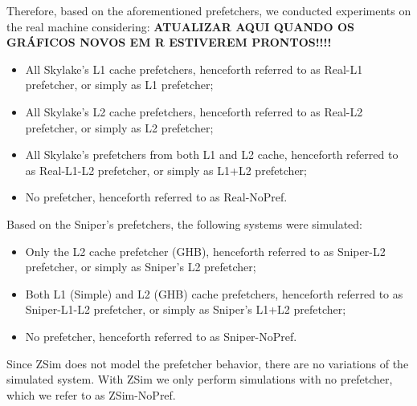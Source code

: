 \documentclass[AMA,final,STIX1COL]{WileyNJD-v2}
\begin{document}
Therefore, based on the aforementioned prefetchers, we conducted experiments on the real machine considering: \textbf{ATUALIZAR AQUI QUANDO OS GRÁFICOS NOVOS EM R ESTIVEREM PRONTOS!!!!}
\begin{itemize}
    \item All Skylake's L1 cache prefetchers, henceforth referred to as Real-L1 prefetcher, or simply as L1 prefetcher;
    \item All Skylake's L2 cache prefetchers, henceforth referred to as Real-L2 prefetcher, or simply as L2 prefetcher;
    \item All Skylake's prefetchers from both L1 and L2 cache, henceforth referred to as Real-L1-L2 prefetcher, or simply as L1+L2 prefetcher;
    \item No prefetcher, henceforth referred to as Real-NoPref.
\end{itemize}

Based on the Sniper's prefetchers, the following systems were simulated:
\begin{itemize}
    \item Only the L2 cache prefetcher (GHB), henceforth referred to as Sniper-L2 prefetcher, or simply as Sniper's L2 prefetcher;
    \item Both L1 (Simple) and L2 (GHB) cache prefetchers, henceforth referred to as Sniper-L1-L2 prefetcher, or simply as Sniper's L1+L2 prefetcher;
    \item No prefetcher, henceforth referred to as Sniper-NoPref.
\end{itemize}

Since ZSim does not model the prefetcher behavior, there are no variations of the simulated system. With ZSim we only perform simulations with no prefetcher, which we refer to as ZSim-NoPref.

\end{document}
